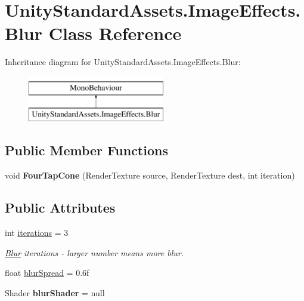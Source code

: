 \hypertarget{class_unity_standard_assets_1_1_image_effects_1_1_blur}{}\section{Unity\+Standard\+Assets.\+Image\+Effects.\+Blur Class Reference}
\label{class_unity_standard_assets_1_1_image_effects_1_1_blur}
Inheritance diagram for Unity\+Standard\+Assets.\+Image\+Effects.\+Blur\+:\begin{figure}[H]
\begin{center}
\leavevmode
\includegraphics[height=2.000000cm]{class_unity_standard_assets_1_1_image_effects_1_1_blur}
\end{center}
\end{figure}
\subsection*{Public Member Functions}
\begin{DoxyCompactItemize}
\item 
void {\bfseries Four\+Tap\+Cone} (Render\+Texture source, Render\+Texture dest, int iteration)\hypertarget{class_unity_standard_assets_1_1_image_effects_1_1_blur_a26bb3f789097c645ad578c94c80fbb2b}{}\label{class_unity_standard_assets_1_1_image_effects_1_1_blur_a26bb3f789097c645ad578c94c80fbb2b}

\end{DoxyCompactItemize}
\subsection*{Public Attributes}
\begin{DoxyCompactItemize}
\item 
int \hyperlink{class_unity_standard_assets_1_1_image_effects_1_1_blur_ab2609005fc43ef0b62eb286caccccc87}{iterations} = 3\hypertarget{class_unity_standard_assets_1_1_image_effects_1_1_blur_ab2609005fc43ef0b62eb286caccccc87}{}\label{class_unity_standard_assets_1_1_image_effects_1_1_blur_ab2609005fc43ef0b62eb286caccccc87}

\begin{DoxyCompactList}\small\item\em \hyperlink{class_unity_standard_assets_1_1_image_effects_1_1_blur}{Blur} iterations -\/ larger number means more blur. \end{DoxyCompactList}\item 
float \hyperlink{class_unity_standard_assets_1_1_image_effects_1_1_blur_a6e904a33ffd2d23536a1a118566f8aad}{blur\+Spread} = 0.\+6f
\item 
Shader {\bfseries blur\+Shader} = null\hypertarget{class_unity_standard_assets_1_1_image_effects_1_1_blur_a0c784511914827899174cc86ae0b55a7}{}\label{class_unity_standard_assets_1_1_image_effects_1_1_blur_a0c784511914827899174cc86ae0b55a7}

\end{DoxyCompactItemize}
